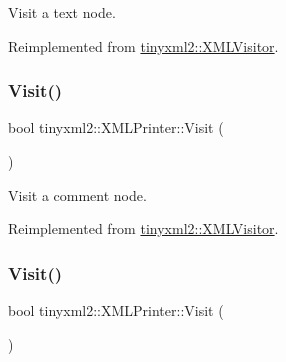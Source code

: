 Visit a text node. 



Reimplemented from \mbox{\hyperlink{classtinyxml2_1_1_x_m_l_visitor_af30233565856480ea48b6fa0d6dec65b}{tinyxml2\+::\+X\+M\+L\+Visitor}}.

\mbox{\label{classtinyxml2_1_1_x_m_l_printer_aa294c5c01af0ebb9114902456e4cb53c}} 
\subsubsection{\texorpdfstring{Visit()}{Visit()}\hspace{0.1cm}{\footnotesize\ttfamily [2/4]}}
{\footnotesize\ttfamily bool tinyxml2\+::\+X\+M\+L\+Printer\+::\+Visit (\begin{DoxyParamCaption}\item[{const \mbox{\hyperlink{classtinyxml2_1_1_x_m_l_comment}{X\+M\+L\+Comment}} \&}]{ }\end{DoxyParamCaption})\hspace{0.3cm}{\ttfamily [virtual]}}



Visit a comment node. 



Reimplemented from \mbox{\hyperlink{classtinyxml2_1_1_x_m_l_visitor_acc8147fb5a85f6c65721654e427752d7}{tinyxml2\+::\+X\+M\+L\+Visitor}}.

\mbox{\label{classtinyxml2_1_1_x_m_l_printer_acfc625b2549304b9c7eb85ebd5c5eb39}} 
\subsubsection{\texorpdfstring{Visit()}{Visit()}\hspace{0.1cm}{\footnotesize\ttfamily [3/4]}}
{\footnotesize\ttfamily bool tinyxml2\+::\+X\+M\+L\+Printer\+::\+Visit (\begin{DoxyParamCaption}\item[{const \mbox{\hyperlink{classtinyxml2_1_1_x_m_l_declaration}{X\+M\+L\+Declaration}} \&}]{ }\end{DoxyParamCaption})\hspace{0.3cm}{\ttfamily [virtual]}}



